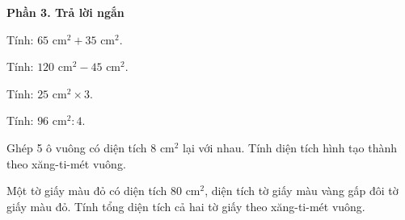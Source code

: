 \textbf{Phần 3. Trả lời ngắn}

\begin{ex} %
Tính: $65\text{ cm}^2 + 35\text{ cm}^2$.
\end{ex}

\begin{ex} %
Tính: $120\text{ cm}^2 - 45\text{ cm}^2$.
\end{ex}

\begin{ex} %
Tính: $25\text{ cm}^2 \times 3$.
\end{ex}

\begin{ex} %
Tính: $96\text{ cm}^2 : 4$.
\end{ex}

\begin{ex} %
Ghép 5 ô vuông có diện tích $8\text{ cm}^2$ lại với nhau. Tính diện tích hình tạo thành theo xăng-ti-mét vuông.
\end{ex}

\begin{ex} %
Một tờ giấy màu đỏ có diện tích $80\text{ cm}^2$, diện tích tờ giấy màu vàng gấp đôi tờ giấy màu đỏ. Tính tổng diện tích cả hai tờ giấy theo xăng-ti-mét vuông.
\end{ex}

